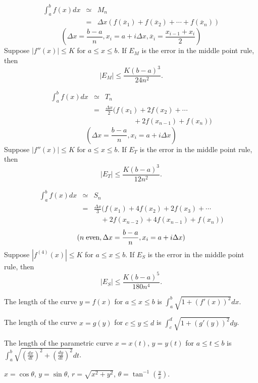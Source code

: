 \documentclass[10pt]{article}
\begin{document}
\begin{eqnarray*}
\int_{a}^{b}f(x)dx&\simeq& M_{n}\\
&=&\Delta x (f(\overline{x}_{1})
+f(\overline{x}_{2})+\cdots +f(\overline{x}_{n}))
\end{eqnarray*}
$$(\Delta x=\frac{b-a}{n}, x_{i}=a+i\Delta x, \overline{x}_{i}
=\frac{x_{i-1}+x_{i}}{2})$$
Suppose $|f''(x)|\le K$ for $a\le x\le b$. If $E_{M}$ is 
the error in the middle point rule, then
$$|E_{M}|\le \frac{K(b-a)^{3}}{24n^{2}}.$$



\begin{eqnarray*}
\int_{a}^{b}f(x)dx&\simeq& T_{n}\\
&=&\frac{\Delta x}{2} 
(f(x_{1})
+2f(x_{2})+\cdots\\
&&\quad\quad\quad\quad
 +2f(x_{n-1})+f(x_{n}))
\end{eqnarray*}
$$(\Delta x=\frac{b-a}{n}, x_{i}=a+i\Delta x)$$
Suppose $|f''(x)|\le K$ for $a\le x\le b$. If $E_{T}$ is 
the error in the middle point rule, then
$$|E_{T}|\le \frac{K(b-a)^{3}}{12n^{2}}.$$


\begin{eqnarray*}
\int_{a}^{b}f(x)dx&\simeq& S_{n}\\
&=& \frac{\Delta x}{3} 
(f(x_{1})
+4f(x_{2})+2f(x_{3})+\cdots\\
&&\quad
 +2f(x_{n-2})+4f(x_{n-1})+f(x_{n}))
\end{eqnarray*}
$$(n \;\mbox{\rm even}, 
\Delta x=\frac{b-a}{n}, x_{i}=a+i\Delta x)$$
Suppose $|f^{(4)}(x)|\le K$ for $a\le x\le b$. If $E_{S}$ is 
the error in the middle point rule, then
$$|E_{S}|\le \frac{K(b-a)^{5}}{180n^{4}}.$$


The length 
of the curve $y=f(x)$ for $a\le x\le b$ is 
${\displaystyle \int_{a}^{b}\sqrt{1+(f'(x))^{2}}dx}$.

The length 
of the curve $x=g(y)$ for $c\le y\le d$ is 
${\displaystyle \int_{c}^{d}\sqrt{1+(g'(y))^{2}}dy}$.

The length of the parametric curve $x=x(t)$, $y=y(t)$ 
for $a\le t\le b$ is 
${\displaystyle \int_{a}^{b}\sqrt{\left(\frac{dx}{dt}\right)^{2}
+\left(\frac{dy}{dt}\right)^{2}}dt}$.


$x=\cos \theta$, $y=\sin \theta$, $r=\sqrt{x^{2}+y^{2}}$,
$\theta=\tan^{-1}\left(\frac{y}{x}\right)$.
\end{document}
